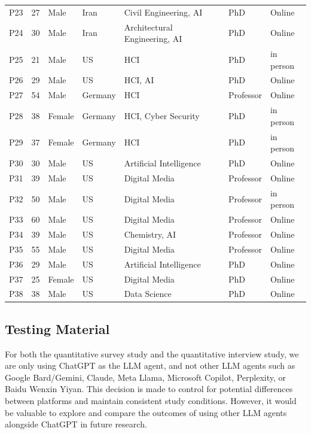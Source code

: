 \documentclass[sigconf]{acmart}
\begin{document}
\begin{table}[h]
\begin{tabular}{p{0.5cm}p{0.5cm}p{1.8cm}p{1.5cm}p{3.8cm}p{1.5cm}p{1.2cm}}
P23 & 27 & Male& Iran & Civil Engineering, AI & PhD &Online\\
P24 & 30 & Male& Iran & Architectural Engineering, AI& PhD &Online\\
P25 & 21 & Male& US & HCI & PhD &in person\\
P26 & 29 & Male& US & HCI, AI & PhD &Online\\
P27 & 54 & Male& Germany & HCI & Professor &Online\\
P28 & 38 & Female & Germany & HCI, Cyber Security & PhD &in person\\
P29 & 37 & Female& Germany & HCI & PhD &in person\\
P30 & 30 & Male& US & Artificial Intelligence & PhD &Online\\
P31 & 39 & Male& US & Digital Media & Professor &Online\\
P32 & 50 & Male& US & Digital Media & Professor &in person\\
P33 & 60 & Male& US & Digital Media & Professor &Online\\
P34 & 39 & Male& US & Chemistry, AI & Professor &Online\\
P35 & 55 & Male& US & Digital Media & Professor &Online\\
P36 & 29 & Male& US & Artificial Intelligence & PhD &Online\\
P37 & 25 & Female& US & Digital Media & PhD &Online\\
P38 & 38 & Male& US & Data Science & PhD &Online\\
\hline
\end{tabular}%

\end{table}%





\subsection{Testing Material}

For both the quantitative survey study and the quantitative interview study, we are only using ChatGPT as the LLM agent, and not other LLM agents such as Google Bard/Gemini, Claude, Meta Llama, Microsoft Copilot, Perplexity, or Baidu Wenxin Yiyan. This decision is made to control for potential differences between platforms and maintain consistent study conditions. However, it would be valuable to explore and compare the outcomes of using other LLM agents alongside ChatGPT in future research.
\end{document}
